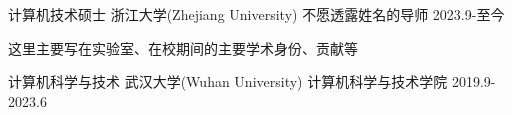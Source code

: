 

\begin{cventries}

  \cventry
    {计算机技术硕士} %
    {浙江大学(Zhejiang University)} %
    {不愿透露姓名的导师} %
    {2023.9-至今} %
    {
      \begin{cvitems} %
        \item {这里主要写在实验室、在校期间的主要学术身份、贡献等}
      \end{cvitems}
    }
    \cventry
    {计算机科学与技术} %
    {武汉大学(Wuhan University)} %
    {计算机科学与技术学院} %
    {2019.9-2023.6} %
    {
    }
\end{cventries}
